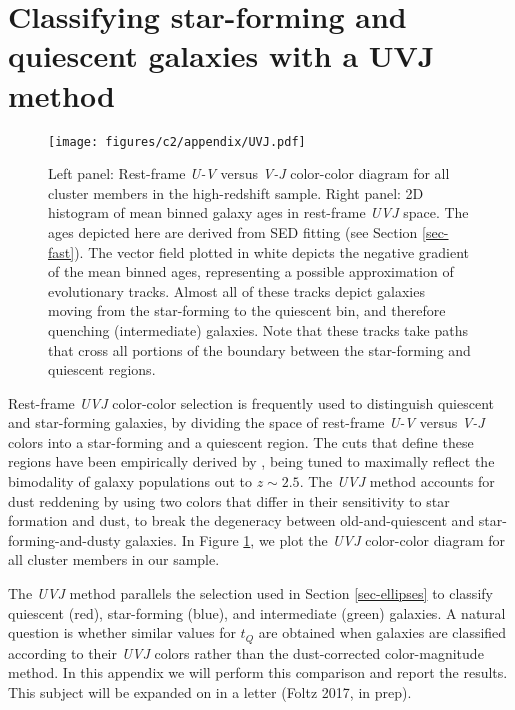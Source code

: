 \section{Classifying star-forming and quiescent galaxies with a UVJ method}\label{sec-a-uvj}

\begin{figure}
\centering \texttt{[image: figures/c2/appendix/UVJ.pdf]}
\caption[Mean binned galaxy ages in rest-frame \textit{UVJ} space]{Left panel: Rest-frame \textit{U-V} versus \textit{V-J} color-color diagram for all cluster members in the high-redshift sample.
Right panel: 2D histogram of mean binned galaxy ages in rest-frame \textit{UVJ} space.
The ages depicted here are derived from SED fitting (see Section \ref{sec-fast}).
The vector field plotted in white depicts the negative gradient of the mean binned ages, representing a possible approximation of evolutionary tracks.
Almost all of these tracks depict galaxies moving from the star-forming to the quiescent bin, and therefore quenching (intermediate) galaxies.
Note that these tracks take paths that cross all portions of the boundary between the star-forming and quiescent regions.
\label{fig-a-UVJ}}
\end{figure}

Rest-frame \textit{UVJ} color-color selection is frequently used to distinguish quiescent and star-forming galaxies, by dividing the space of rest-frame \textit{U-V} versus \textit{V-J} colors into a star-forming and a quiescent region.
The cuts that define these regions have been empirically derived by \citet{Williams:2009tt}, being tuned to maximally reflect the bimodality of galaxy populations out to $z\sim2.5$.
The \textit{UVJ} method accounts for dust reddening by using two colors that differ in their sensitivity to star formation and dust, to break the degeneracy between old-and-quiescent and star-forming-and-dusty galaxies.
In Figure \ref{fig-a-UVJ}, we plot the \textit{UVJ} color-color diagram for all cluster members in our sample.

The \textit{UVJ} method parallels the selection used in Section \ref{sec-ellipses} to classify quiescent (red), star-forming (blue), and intermediate (green) galaxies.
A natural question is whether similar values for $t_Q$ are obtained when galaxies are classified according to their \textit{UVJ} colors rather than the dust-corrected color-magnitude method.
In this appendix we will perform this comparison and report the results.
This subject will be expanded on in a letter (Foltz 2017, in prep).

